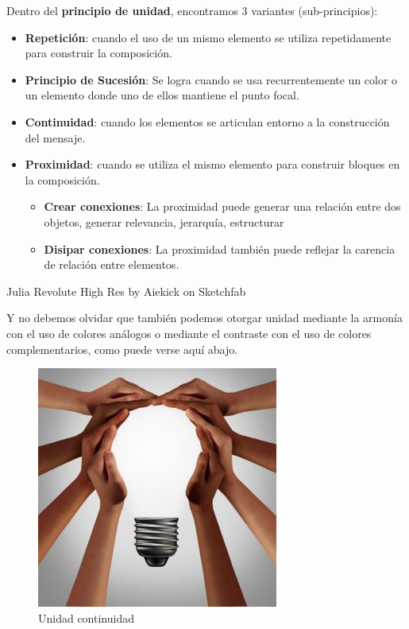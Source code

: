 \documentclass[
  16pt,
]{krantz}
\theoremstyle{definition}
\theoremstyle{definition}
\theoremstyle{definition}
\theoremstyle{definition}
\theoremstyle{remark}
\begin{document}
Dentro del \textbf{principio de unidad}, encontramos 3 variantes (sub-principios):

\begin{itemize}
\item
  \textbf{Repetición}: cuando el uso de un mismo elemento se utiliza repetidamente para construir la composición.
\item
  \textbf{Principio de Sucesión}: Se logra cuando se usa recurrentemente un color o un elemento donde uno de ellos mantiene el punto focal.
\item
  \textbf{Continuidad}: cuando los elementos se articulan entorno a la construcción del mensaje.
\item
  \textbf{Proximidad}: cuando se utiliza el mismo elemento para construir bloques en la composición.

  \begin{itemize}
  \item
    \textbf{Crear conexiones}: La proximidad puede generar una relación entre dos objetos, generar relevancia, jerarquía, estructurar
  \item
    \textbf{Disipar conexiones}: La proximidad también puede reflejar la carencia de relación entre elementos.
  \end{itemize}
\end{itemize}

Julia Revolute High Res by Aiekick on Sketchfab

Y no debemos olvidar que también podemos otorgar unidad mediante la armonía con el uso de colores análogos o mediante el contraste con el uso de colores complementarios, como puede verse aquí abajo.

\begin{figure}

{\centering \includegraphics[width=1\linewidth,height=1\textheight]{unidad1} 

}

\caption{Unidad continuidad}\label{fig:unidad1}
\end{figure}
\end{document}
